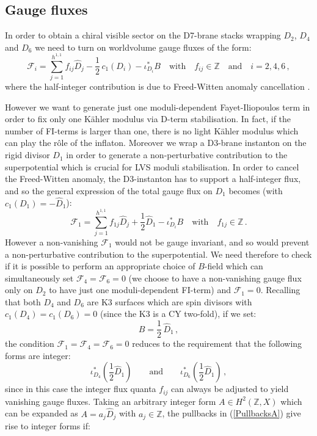 \documentclass[11pt,a4paper]{article}
\newcommand{\be}{\begin{equation}}
\newcommand{\ee}{\end{equation}}
\newcommand{\F}{\mathcal{F}}
\begin{document}
\subsection{Gauge fluxes}

In order to obtain a chiral visible sector on the D7-brane stacks wrapping $D_2$, $D_4$ and $D_6$ we need to turn on worldvolume gauge fluxes of the form:
\be
\F_i = \sum_{j=1}^{h^{1,1}} f_{ij}\hat{D}_j - \frac12 \,c_1({D}_i) - \iota_{D_i}^*B \quad\text{with}\quad f_{ij}\in \mathbb{Z} \quad\text{and}\quad i=2,4,6\,,
\ee
where the half-integer contribution is due to Freed-Witten anomaly cancellation \cite{Minasian:1997mm, Freed:1999vc}. 

However we want to generate just one moduli-dependent Fayet-Iliopoulos term in order to fix only one K\"ahler modulus via D-term stabilisation. In fact, if the number of FI-terms is larger than one, there is no light K\"ahler modulus which can play the r\^ole of the inflaton. Moreover we wrap a D3-brane instanton on the rigid divisor $D_1$ in order to generate a non-perturbative contribution to the superpotential which is crucial for LVS moduli stabilisation. In order to cancel the Freed-Witten anomaly, the D3-instanton has to support a half-integer flux, and so the general expression of the total gauge flux on $D_1$ becomes (with $c_1(D_1) =-\hat{D}_1$):
\be
\F_1 = \sum_{j=1}^{h^{1,1}} f_{1j}\hat{D}_j + \frac12 \hat{D}_1 - \iota_{D_i}^*B \quad\text{with}\quad f_{1j}\in \mathbb{Z}\,.
\ee
However a non-vanishing $\F_1$ would not be gauge invariant, and so would prevent a non-perturbative contribution to the superpotential. We need therefore to check if it is possible to perform an appropriate choice of $B$-field which can simultaneously set $\F_4=\F_6=0$ (we choose to have a non-vanishing gauge flux only on $D_2$ to have just one moduli-dependent FI-term) and $\F_1=0$. Recalling that both $D_4$ and $D_6$ are K3 surfaces which are spin divisors with $c_1(D_4)=c_1(D_6)=0$ (since the K3 is a CY two-fold), if we set:
\be
B = \frac12 \,\hat{D}_1\,,
\label{BfieldA}
\ee
the condition $\F_1=\F_4=\F_6=0$ reduces to the requirement that the following forms are integer:
\be
\iota_{D_4}^* \left(\frac12 \hat{D}_1 \right) \qquad\text{and}\qquad
\iota_{D_6}^* \left(\frac12 \hat{D}_1 \right)\,,
\label{PullbacksA}
\ee
since in this case the integer flux quanta $f_{ij}$ can always be adjusted to yield vanishing gauge fluxes. 
Taking an arbitrary integer form $A\in H^2(\mathbb{Z},X)$ which can be expanded as $A=a_j\hat{D}_j$ with $a_j \in \mathbb{Z}$, the pullbacks in (\ref{PullbacksA}) give rise to integer forms if:
\end{document}
